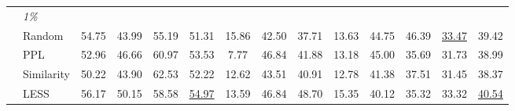 \documentclass[letterpaper]{article} %
\begin{document}
\begin{table}[!t]
\begin{adjustbox}{max width=1.0\textwidth}
\begin{tabular}{llcccccccccccc}
                                                    & \textit{1\%}                                       &                                   &                                   &                                   &                                      &                                  &                                   &                                   &                                   &                                   &                                   &                                      &                                      \\
                                                    & Random                                             & 54.75                             & 43.99                             & 55.19                             & 51.31                                & 15.86                            & 42.50                             & 37.71                             & 13.63                             & 44.75                             & 46.39                             & \underline{33.47}                                & 39.42                                \\
                                                    & PPL                                                & 52.96                             & 46.66                             & 60.97                             & 53.53                                & 7.77                             & 46.84                             & 41.88                             & 13.18                             & 45.00                             & 35.69                             & 31.73                                & 38.99                                \\
                                                    & Similarity                                         & 50.22                             & 43.90                             & 62.53                             & 52.22                                & 12.62                            & 43.51                             & 40.91                             & 12.78                             & 41.38                             & 37.51                             & 31.45                                & 38.37                                \\
                                                    & LESS                                               & 56.17                             & 50.15                             & 58.58                             & \underline{54.97}                                & 13.59                            & 46.84                             & 48.70                             & 15.35                             & 40.12                             & 35.32                             & 33.32                                & \underline{40.54}                                \\

\end{tabular}
\end{adjustbox}
\end{table}
\end{document}
